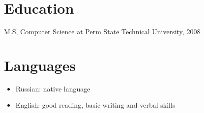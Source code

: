 \documentclass[12pt]{res}
\begin{document}
\begin{resume}
\section{Education}
M.S, Computer Science at Perm State Technical University, 2008

\section{Languages}
\begin{itemize}
\item Russian: native language
\item English: good reading, basic writing and verbal skills
\end{itemize}

\end{resume}
\end{document}

